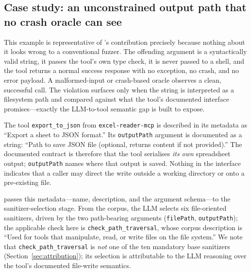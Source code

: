 
\subsection{Case study: an unconstrained output path that no crash oracle can see}
\label{sec:casestudy-excel}

This example is representative of \project{}'s contribution precisely because
nothing about it looks wrong to a conventional fuzzer. The offending argument
is a syntactically valid string, it passes the tool's own type check, it is
never passed to a shell, and the tool returns a normal success response with no
exception, no crash, and no error payload. A malformed-input or crash-based
oracle observes a clean, successful call. The violation surfaces only when the
string is interpreted as a filesystem path and compared against what the tool's
documented interface promises---exactly the LLM-to-tool semantic gap
\project{} is built to expose.

The tool \texttt{export\_to\_json} from \texttt{excel-reader-mcp} is described
in its metadata as ``Export a sheet to JSON format.'' Its \texttt{outputPath}
argument is documented as a string: ``Path to save JSON file (optional, returns
content if not provided).'' The documented contract is therefore that the tool
serialises \emph{its own} spreadsheet output; \texttt{outputPath} names where
that output is saved. Nothing in the interface indicates that a caller may
direct the write outside a working directory or onto a pre-existing file.

\project{} passes this metadata---name, description, and the argument
schema---to the sanitizer-selection stage. From the corpus, the LLM selects six
file-oriented sanitizers, driven by the two path-bearing arguments
(\texttt{filePath}, \texttt{outputPath}); the applicable check here is
\texttt{check\_path\_traversal}, whose corpus description is ``Used for tools
that manipulate, read, or write files on the file system.'' We note that
\texttt{check\_path\_traversal} is \emph{not} one of the ten mandatory base
sanitizers (Section~\ref{sec:attribution}); its selection is attributable to
the LLM reasoning over the tool's documented file-write semantics.


